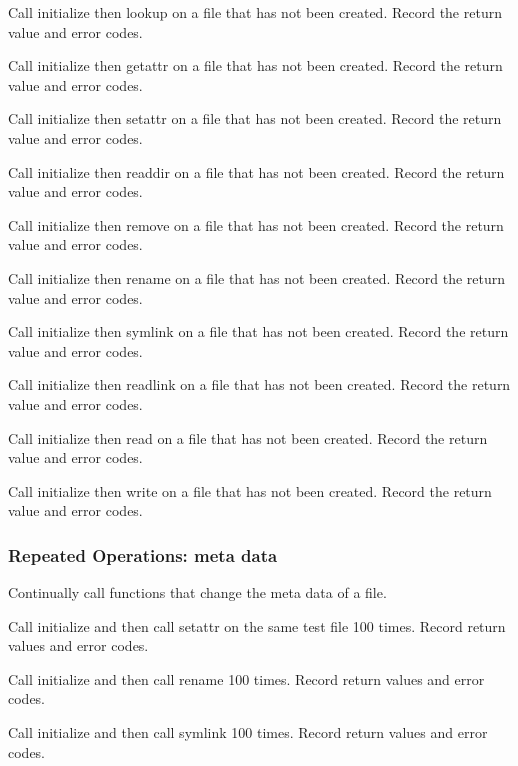 \documentclass[12pt]{article} %
\begin{document}
\begin{list}{.}{}
\item Call initialize then lookup on a file that has not been created.  Record the return value and error codes.
\item Call initialize then getattr on a file that has not been created.  Record the return value and error codes.
\item Call initialize then setattr on a file that has not been created.  Record the return value and error codes.
\item Call initialize then readdir on a file that has not been created.  Record the return value and error codes.
\item Call initialize then remove on a file that has not been created.  Record the return value and error codes.
\item Call initialize then rename on a file that has not been created.  Record the return value and error codes.
\item Call initialize then symlink on a file that has not been created.  Record the return value and error codes.
\item Call initialize then readlink on a file that has not been created.  Record the return value and error codes.
\item Call initialize then read on a file that has not been created.  Record the return value and error codes.
\item Call initialize then write on a file that has not been created.  Record the return value and error codes.
\end{list}

\subsubsection{Repeated Operations: meta data}
Continually call functions that change the meta data of a file.

\begin{list}{.}{}
\item Call initialize and then call setattr on the same test file 100 times.  Record return values and error codes.
\item Call initialize and then call rename 100 times.  Record return values and error codes.
\item Call initialize and then call symlink 100 times.  Record return values and error codes.
\end{list}
\end{document}
